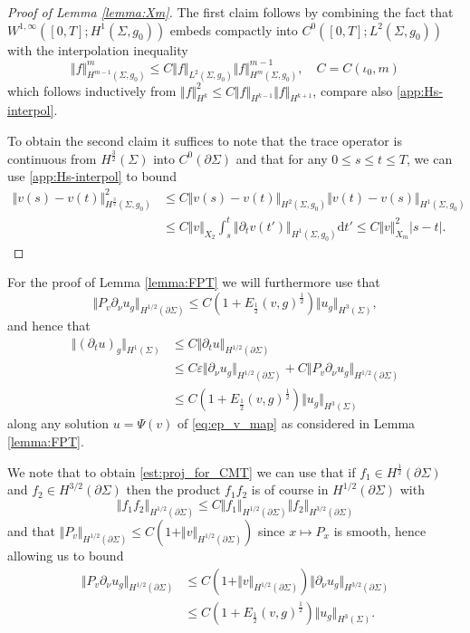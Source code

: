 \documentclass[10pt,reqno]{amsart}
\theoremstyle{plain}
\theoremstyle{definition}
\newcommand{\pnu}{\partial_\nu}
\numberwithin{equation}{section}
\newcommand{\Si}{\Sigma}
\DeclareMathOperator{\inj}{inj}
\newcommand{\norm}[1]{\Vert#1\Vert}
\newcommand{\beqa}{\begin{equation}\begin{aligned}}
\newcommand{\eeqa}{\end{aligned}\end{equation}}
\newcommand{\beqas}{\begin{equation*}\begin{aligned}}
\newcommand{\eeqas}{\end{aligned}\end{equation*}}
\newcommand{\half}{\frac{1}{2}}
\newcommand{\dd}{\mathrm{d}} %
\newcommand{\pt}{\partial_t}
\newcommand{\abs}[1]{\vert#1\vert}
\newcommand{\eps}{\varepsilon}
\newcommand{\pSi}{{\partial \Sigma}}
\newcommand{\hf}{\frac{1}{2}} %
\newcommand{\p}{\partial} %
\begin{document}
\begin{proof}[Proof of Lemma \ref{lemma:Xm}]
    The first claim follows by combining the fact that  $W^{1,\infty}([0,T];H^1(\Si,g_0))$ embeds compactly into $ C^0([0,T];L^2(\Si,g_0))$ with the interpolation inequality
    \begin{equation*}
    	\norm{f}_{H^{m-1}(\Si,g_0)}^m \leq C\norm{f}_{L^2(\Si,g_0)}\norm{f}_{H^m(\Si,g_0)}^{m-1}, \quad C=C(\iota_0,m)
    \end{equation*}
    which follows inductively from $\norm{f}_{H^k}^2\leq C \norm{f}_{H^{k-1}}\norm{f}_{H^{k+1}}$, compare also \eqref{app:Hs-interpol}.
  
    To obtain the second claim it suffices to note that the trace operator is continuous from $H^\frac{3}{2}(\Si)$ into $C^0(\p \Si)$ and that for any $0\leq s\leq t\leq T$, we can use \eqref{app:Hs-interpol} to bound 
    \begin{align*}
    	\norm{v(s) - v(t)}_{H^\frac{3}{2}(\Si,g_0)}^2 &\leq C\norm{v(s) - v(t)}_{H^2(\Si,g_0)}\norm{v(t) - v(s)}_{H^1(\Si,g_0)}\\
    	&\leq C\norm{v}_{X_2}\int_s^t\norm{\p_{t} v(t')}_{H^1(\Si,g_0)} \dd t'\leq C\norm{v}_{X_m}^2 \abs{s-t}.
    \end{align*}
\end{proof}
For the proof of Lemma \ref{lemma:FPT} we will furthermore use that
\begin{equation}\label{est:proj_for_CMT}
    \norm{P_{v}\p_\nu u_g}_{H^{1/2}(\pSi)} \leq C(1 + E_\hf(v,g)^\hf)\norm{u_g}_{H^3(\Si)}, 
\end{equation}
and hence that 
\beqa\label{est:pt_for_CMT}
    \norm{(\pt u)_g}_{H^{1}(\Si)} &\leq  C\norm{\pt u}_{H^{1/2}(\pSi)}\\
    &\leq C\eps  \norm{\pnu u_g}_{H^{1/2}(\pSi)}+ C \norm{P_{v}\p_\nu u_g}_{H^{1/2}(\pSi)}\\
    & \leq C(1 + E_\hf(v,g)^\hf)\norm{u_g}_{H^3(\Si)}
\eeqa
along any solution $u=\Psi(v)$ of \eqref{eq:ep_v_map} as considered in Lemma \ref{lemma:FPT}.

We note that to obtain  \eqref{est:proj_for_CMT} we can use that if $f_1\in H^{\half}(\pSi)$ and $f_2\in H^{3/2}(\pSi)$ then the product $f_1 f_2$ is of course in $H^{1/2}(\pSi)$ with 
$$\norm{f_1f_2}_{H^{1/2}(\pSi)}\leq C \norm{f_1}_{H^{1/2}(\pSi)}\norm{f_2}_{H^{3/2}(\pSi)}$$
and that $\norm{P_v}_{H^{1/2}(\pSi)}\leq C(1+\norm{v}_{H^{1/2}(\pSi)})$ since $x\mapsto P_{x}$ is smooth, hence allowing us to bound
\beqas
    \norm{P_{v}\pnu u_g}_{H^{1/2}(\p\Si)} & \leq C(1+\norm{v}_{H^{1/2}(\pSi)}) \norm{\p_{\nu}u_g}_{H^{3/2}(\p\Si)} \\
    & \leq C(1 + E_\half(v,g)^{\half}) \norm{u_g}_{H^3(\Si)}.
\eeqas
\end{document}
